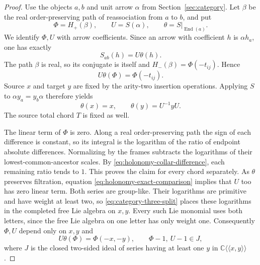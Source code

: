 \documentclass[11pt]{article}
\newcommand{\CC}{\mathbb C}
\theoremstyle{definition}
\theoremstyle{remark}
\numberwithin{equation}{section}
\begin{document}
\begin{proof}
Use the objects $a,b$ and unit arrow $\alpha$ from
Section~\ref{sec:category}.  Let $\beta$ be the real order-preserving
path of reassociation from $a$ to $b$, and put
\[
 \Phi=H_+(\beta),\qquad U=S(\alpha),\qquad
 \theta=S|_{\operatorname{End}(a)}.
\]
We identify $\Phi,U$ with arrow coefficients.  Since an arrow with
coefficient $h$ is $\alpha h_a$, one has exactly
\begin{equation}\label{eq:holonomy-arrow-action}
 S_{ab}(h)=U\theta(h).
\end{equation}
The path $\beta$ is real, so its conjugate is itself and
$H_-(\beta)=\Phi(-t_{ij})$.  Hence
\begin{equation}\label{eq:holonomy-exact-comparison}
 U\theta(\Phi)=\Phi(-t_{ij}).
\end{equation}
Source $x$ and target $y$ are fixed by the arity-two insertion
operations.  Applying $S$ to $\alpha y_a=y_b\alpha$ therefore yields
\begin{equation}\label{eq:holonomy-source-action}
 \theta(x)=x,\qquad \theta(y)=U^{-1}yU.
\end{equation}
The source total chord $T$ is fixed as well.

The linear term of $\Phi$ is zero.  Along a real order-preserving
path the sign of each difference is constant, so its integral is the
logarithm of the ratio of endpoint absolute differences.  Normalizing
by the frames subtracts the logarithms of their lowest-common-ancestor
scales.  By \eqref{eq:holonomy-collar-difference}, each remaining
ratio tends to $1$.  This proves the claim for every chord separately.
As $\theta$ preserves filtration, equation
\eqref{eq:holonomy-exact-comparison} implies that $U$ too has zero
linear term.  Both series are group-like.  Their logarithms are
primitive and have weight at least two, so
\eqref{eq:category-three-split} places these logarithms in the
completed free Lie algebra on $x,y$.  Every such Lie monomial uses
both letters, since the free Lie algebra on one letter has only
weight one.  Consequently $\Phi,U$ depend only on $x,y$ and
\begin{equation}\label{eq:holonomy-exact-xy}
 U\theta(\Phi)=\Phi(-x,-y),\qquad
 \Phi-1,\ U-1\in J,
\end{equation}
where $J$ is the closed two-sided ideal of series having at least one
$y$ in $\CC\langle\!\langle x,y\rangle\!\rangle$.


\end{proof}
\end{document}

